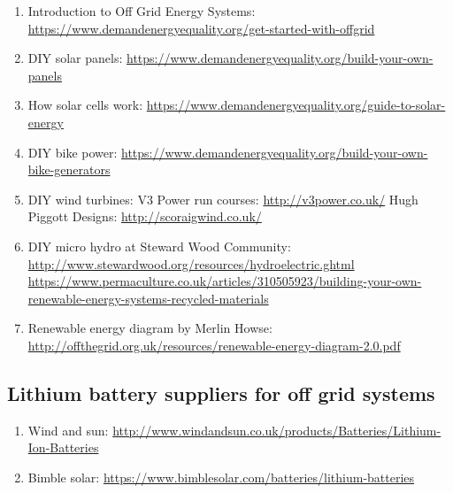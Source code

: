 \documentclass{article}
\theoremstyle{definition}
\theoremstyle{definition}
\theoremstyle{remark}
\begin{document}
    \begin{enumerate}[resume]
      \item Introduction to Off Grid Energy Systems: \newline
        \url{https://www.demandenergyequality.org/get-started-with-offgrid}
      \item DIY solar panels: \newline
        \url{https://www.demandenergyequality.org/build-your-own-panels}
      \item How solar cells work: \newline
        \url{https://www.demandenergyequality.org/guide-to-solar-energy}
      \item DIY bike power: \newline
        \url{https://www.demandenergyequality.org/build-your-own-bike-generators}
      \item DIY wind turbines: \newline
        V3 Power run courses: \url{http://v3power.co.uk/} \newline
        Hugh Piggott Designs: \url{http://scoraigwind.co.uk/}
      \item DIY micro hydro at Steward Wood Community: \newline
        \url{http://www.stewardwood.org/resources/hydroelectric.ghtml} \newline
        \url{https://www.permaculture.co.uk/articles/310505923/building-your-own-renewable-energy-systems-recycled-materials}
      \item Renewable energy diagram by Merlin Howse: \newline
        \url{http://offthegrid.org.uk/resources/renewable-energy-diagram-2.0.pdf}
    \end{enumerate}
  

  \subsection{Lithium battery suppliers for off grid systems} %
  \label{sub:lithium_battery_suppliers_for_off_grid_systems}

    \begin{enumerate}[resume]
      \item Wind and sun: \url{http://www.windandsun.co.uk/products/Batteries/Lithium-Ion-Batteries}
      \item Bimble solar: \url{https://www.bimblesolar.com/batteries/lithium-batteries}
    \end{enumerate}
  
\end{document}
